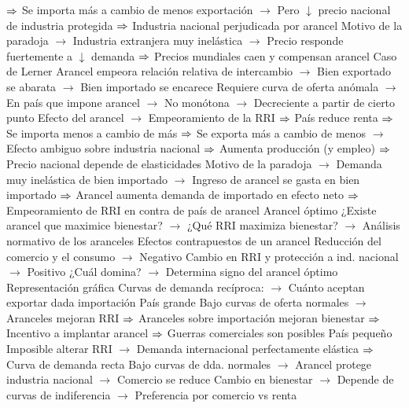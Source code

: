 \documentclass{nuevotema}
\begin{document}
\begin{esquemal}
				\4[] $\Rightarrow$ Se importa más a cambio de menos exportación
				\4[] $\to$ Pero $\downarrow$ precio nacional de industria protegida
				\4[] $\Rightarrow$ Industria nacional perjudicada por arancel
				\4[] Motivo de la paradoja
				\4[] $\to$ Industria extranjera muy inelástica
				\4[] $\to$ Precio responde fuertemente a $\downarrow$ demanda
				\4[] $\Rightarrow$ Precios mundiales caen y compensan arancel
				\4 Caso de Lerner
				\4[] 
				\4[] Arancel empeora relación relativa de intercambio
				\4[] $\to$ Bien exportado se abarata
				\4[] $\to$ Bien importado se encarece
				\4[] Requiere curva de oferta anómala
				\4[] $\to$ En país que impone arancel
				\4[] $\to$ No monótona
				\4[] $\to$ Decreciente a partir de cierto punto
				\4[] Efecto del arancel
				\4[] $\to$ Empeoramiento de la RRI
				\4[] $\Rightarrow$ País reduce renta
				\4[] $\Rightarrow$ Se importa menos a cambio de más
				\4[] $\Rightarrow$ Se exporta más a cambio de menos
				\4[] $\to$ Efecto ambiguo sobre industria nacional
				\4[] $\Rightarrow$ Aumenta producción (y empleo)
				\4[] $\Rightarrow$ Precio nacional depende de elasticidades
				\4[] Motivo de la paradoja
				\4[] $\to$ Demanda muy inelástica de bien importado
				\4[] $\to$ Ingreso de arancel se gasta en bien importado
				\4[] $\Rightarrow$ Arancel aumenta demanda de importado en efecto neto
				\4[] $\Rightarrow$ Empeoramiento de RRI en contra de país de arancel
			\3 Arancel óptimo
				\4[] ¿Existe arancel que maximice bienestar?
				\4[] $\to$ ¿Qué RRI maximiza bienestar?
				\4[] $\to$ Análisis normativo de los aranceles
				\4 Efectos contrapuestos de un arancel
				\4[] Reducción del comercio y el consumo
				\4[] $\to$ Negativo
				\4[] Cambio en RRI y protección a ind. nacional
				\4[] $\to$ Positivo
				\4[] ¿Cuál domina?
				\4[] $\to$ Determina signo del arancel óptimo
				\4 Representación gráfica
				\4[] Curvas de demanda recíproca:
				\4[] $\to$ Cuánto aceptan exportar dada importación
				\4[] 
				\4 País grande
				\4[] Bajo curvas de oferta normales
				\4[] $\to$ Aranceles mejoran RRI
				\4[] $\Rightarrow$ Aranceles sobre importación mejoran bienestar
				\4[] $\Rightarrow$ Incentivo a implantar arancel
				\4[] $\Rightarrow$ Guerras comerciales son posibles
				\4 País pequeño
				\4[] Imposible alterar RRI
				\4[] $\to$ Demanda internacional perfectamente elástica
				\4[] $\Rightarrow$ Curva de demanda recta
				\4[] Bajo curvas de dda. normales
				\4[] $\to$ Arancel protege industria nacional
				\4[] $\to$ Comercio se reduce
				\4[] Cambio en bienestar
				\4[] $\to$ Depende de curvas de indiferencia
				\4[] $\to$ Preferencia por comercio vs renta

\end{esquemal}
\end{document}
